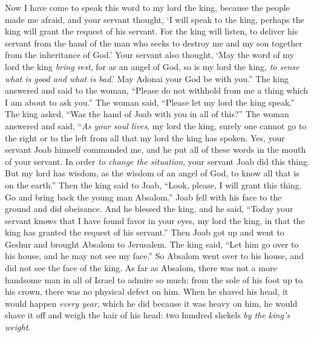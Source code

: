 \begin{biblechapter}
\verse Now I have come to speak this word to my lord the king, because the people made me afraid, and your servant thought, ‘I will speak to the king, perhaps the king will grant the request of his servant.
\verse For the king will listen, to deliver his servant from the hand of the man who seeks to destroy me and my son together from the inheritance of God.’
\verse Your servant also thought, ‘May the word of my lord the king \textit{bring rest}, for as an angel of God, so is my lord the king, \textit{to sense what is good and what is bad}.’ May Adonai your God be with you.”
\verse The king answered and said to the woman, “Please do not withhold from me a thing which I am about to ask you.” The woman said, “Please let my lord the king speak.”
\verse The king asked, “Was the hand of Joab with you in all of this?” The woman answered and said, “\textit{As your soul lives}, my lord the king, surely one cannot go to the right or to the left from all that my lord the king has spoken. Yes, your servant Joab himself commanded me, and he put all of these words in the mouth of your servant.
\verse In order \textit{to change the situation}, your servant Joab did this thing. But my lord has wisdom, as the wisdom of an angel of God, to know all that is on the earth.”
\verse Then the king said to Joab, “Look, please, I will grant this thing. Go and bring back the young man Absalom.”
\verse Joab fell with his face to the ground and did obeisance. And he blessed the king, and he said, “Today your servant knows that I have found favor in your eyes, my lord the king, in that the king has granted the request of his servant.”
 Then Joab got up and went to Geshur and brought Absalom to Jerusalem.
\verse The king said, “Let him go over to his house, and he may not see my face.” So Absalom went over to his house, and did not see the face of the king.
\verse As far as Absalom, there was not a more handsome man in all of Israel to admire so much; from the sole of his foot up to his crown, there was no physical defect on him.
\verse When he shaved his head, it would happen \textit{every year}, which he did because it was heavy on him, he would shave it off and weigh the hair of his head: two hundred shekels \textit{by the king’s weight}.

\end{biblechapter}
